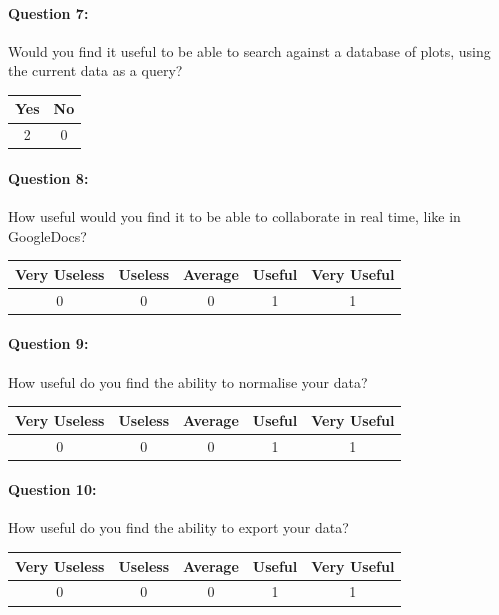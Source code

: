 \paragraph*{Question 7: } Would you find it useful to be able to search against a database of plots, using the current data as a query?

\begin{center}
\begin{tabular}{ | c | c |}
    \hline
    Yes & No\\
    \hline
    2 & 0 \\
    \hline
\end{tabular}
\end{center}

\paragraph*{Question 8: } How useful would you find it to be able to collaborate in real time, like in GoogleDocs?
\begin{center}
\begin{tabular}{ | c | c | c | c | c |}
    \hline
    Very Useless & Useless  & Average & Useful & Very Useful \\
    \hline
    0 & 0 & 0 & 1 & 1 \\
    \hline
\end{tabular}
\end{center}

\paragraph*{Question 9: } How useful do you find the ability to normalise your data?
\begin{center}
\begin{tabular}{ | c | c | c | c | c |}
    \hline
    Very Useless & Useless  & Average & Useful & Very Useful \\
    \hline
    0 & 0 & 0 & 1 & 1 \\
    \hline
\end{tabular}
\end{center}

\paragraph*{Question 10: } How useful do you find the ability to export your data?
\begin{center}
\begin{tabular}{ | c | c | c | c | c |}
    \hline
    Very Useless & Useless  & Average & Useful & Very Useful \\
    \hline
    0 & 0 & 0 & 1 & 1 \\
    \hline
\end{tabular}
\end{center}

